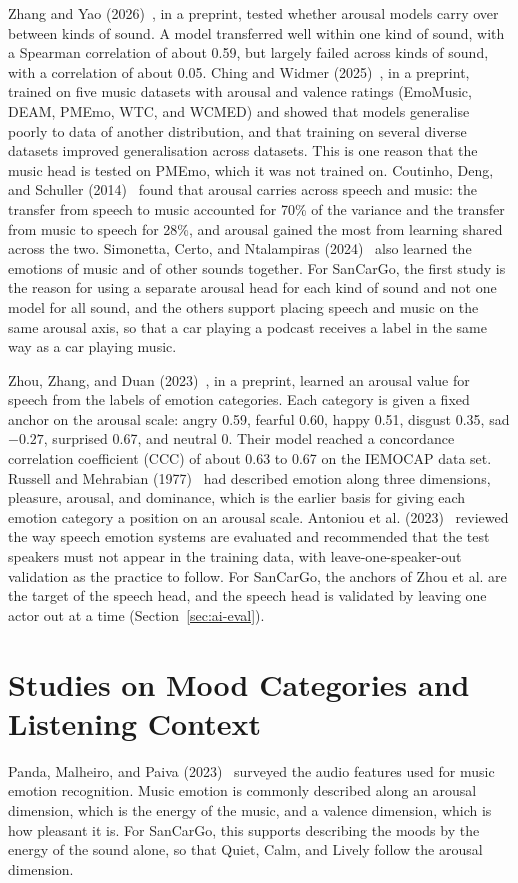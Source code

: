 Zhang and Yao (2026)~\cite{zhang2026generalisation}, in a preprint, tested whether arousal models carry over between kinds of sound. A model transferred well within one kind of sound, with a Spearman correlation of about 0.59, but largely failed across kinds of sound, with a correlation of about 0.05. Ching and Widmer (2025)~\cite{ching2025gap}, in a preprint, trained on five music datasets with arousal and valence ratings (EmoMusic, DEAM, PMEmo, WTC, and WCMED) and showed that models generalise poorly to data of another distribution, and that training on several diverse datasets improved generalisation across datasets. This is one reason that the music head is tested on PMEmo, which it was not trained on. Coutinho, Deng, and Schuller (2014)~\cite{coutinho2014transfer} found that arousal carries across speech and music: the transfer from speech to music accounted for 70\% of the variance and the transfer from music to speech for 28\%, and arousal gained the most from learning shared across the two. Simonetta, Certo, and Ntalampiras (2024)~\cite{simonetta2024joint} also learned the emotions of music and of other sounds together. For SanCarGo, the first study is the reason for using a separate arousal head for each kind of sound and not one model for all sound, and the others support placing speech and music on the same arousal axis, so that a car playing a podcast receives a label in the same way as a car playing music.

Zhou, Zhang, and Duan (2023)~\cite{zhou2023arousal}, in a preprint, learned an arousal value for speech from the labels of emotion categories. Each category is given a fixed anchor on the arousal scale: angry 0.59, fearful 0.60, happy 0.51, disgust 0.35, sad $-0.27$, surprised 0.67, and neutral 0. Their model reached a concordance correlation coefficient (CCC) of about 0.63 to 0.67 on the IEMOCAP data set. Russell and Mehrabian (1977)~\cite{russell1977threefactor} had described emotion along three dimensions, pleasure, arousal, and dominance, which is the earlier basis for giving each emotion category a position on an arousal scale. Antoniou et al. (2023)~\cite{antoniou2023speech} reviewed the way speech emotion systems are evaluated and recommended that the test speakers must not appear in the training data, with leave-one-speaker-out validation as the practice to follow. For SanCarGo, the anchors of Zhou et al. are the target of the speech head, and the speech head is validated by leaving one actor out at a time (Section~\ref{sec:ai-eval}).

\section{Studies on Mood Categories and Listening Context}
\label{sec:lit-music}
Panda, Malheiro, and Paiva (2023)~\cite{panda2023audio} surveyed the audio features used for music emotion recognition. Music emotion is commonly described along an arousal dimension, which is the energy of the music, and a valence dimension, which is how pleasant it is. For SanCarGo, this supports describing the moods by the energy of the sound alone, so that Quiet, Calm, and Lively follow the arousal dimension.

